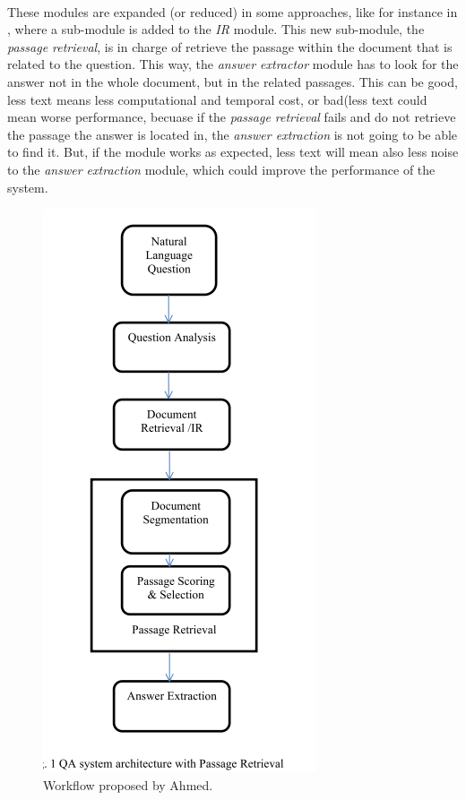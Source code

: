 \paragraph{}
These modules are expanded (or reduced) in some approaches, like for instance in \cite{Ahmed2016a}, where a sub-module is added to the \emph{IR} module. This new sub-module, the \emph{passage retrieval}, is in charge of retrieve the passage within the document that is related to the question. This way, the \emph{answer extractor} module has to look for the answer not in the whole document, but in the related passages. This can be good, less text means less computational and temporal cost, or bad(less text could mean worse performance, becuase if the \emph{passage retrieval} fails and do not retrieve the passage the answer is located in, the \emph{answer extraction} is not going to be able to find it. But, if the module works as expected, less text will mean also less noise to the \emph{answer extraction} module, which could improve the performance of the system.
\begin{figure}[!h]
	\centering
	\includegraphics[scale=0.35]{images/ahmed2016}
	\caption{Workflow proposed by Ahmed.}
	\label{fig:ahmed}
\end{figure}
